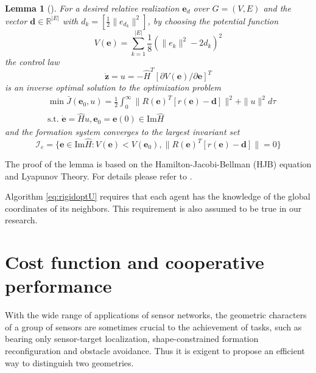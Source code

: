 \documentclass[times]{rncauth}
\newtheorem{lem}{Lemma}[section]
\begin{document}
\begin{lem}[\cite{Dorfler09cooperativeBehavior}]\label{lemma:dorfler}
For a desired relative realization $\mathbf{e}_d$ over $G=(V,E)$ and
the vector $\mathbf{d}\in\mathbb{R}^{|E|}$ with
$d_k=[\frac{1}{2}\|e_{d_k}\|^2]$, by choosing the potential function
\begin{equation}
  V(\mathbf{e})=\sum_{k=1}^{|E|}\frac{1}{8}(\|e_k\|^2-2d_k)^2
\end{equation}
the control law
\begin{equation}\label{eq:rigidoptU}
  \dot{\mathbf{z}}=u=-\hat{H}^T [\partial V(\mathbf{e})/\partial \mathbf{e}]^T
\end{equation}
is an \emph{inverse} optimal solution to the optimization problem
\begin{align}\label{eq:rigidoptJ}
  &\min\bar{J}(\mathbf{e}_0,u)=\frac{1}{2}\int^\infty_0\|R(\mathbf{e})^T[r(\mathbf{e})-\mathbf{d}]\|^2+\|u\|^2d\tau\nonumber\\
&\text{s.t. } \dot{\mathbf{e}}=\hat{H} u,
\mathbf{e}_0=\mathbf{e}(0)\in \text{Im}\hat{H}
\end{align}
and the formation system converges to the largest  invariant set
\begin{equation}\label{eq:invariantset_dor}
\mathcal{I}_e=\{\mathbf{e}\in \text{Im} \hat{H}:
V(\mathbf{e})<V(\mathbf{e}_0),
\|R(\mathbf{e})^T[r(\mathbf{e})-\mathbf{d}]\|=0 \}\end{equation}
\end{lem}
The proof of the lemma is based on the Hamilton-Jacobi-Bellman (HJB)
equation and Lyapunov Theory. For details please refer to
\cite{Dorfler09cooperativeBehavior}.






Algorithm \eqref{eq:rigidoptU} requires that each agent has the
knowledge of the global coordinates of its neighbors. This
requirement is also assumed to be true in our research.

\section{Cost function and cooperative performance}
With the wide range of applications of sensor networks, the geometric characters of  a group of sensors are sometimes crucial to the achievement of tasks, such as bearing only sensor-target localization, shape-constrained formation reconfiguration and obstacle avoidance. Thus it is exigent to propose an  efficient way to distinguish two geometries.
\end{document}
